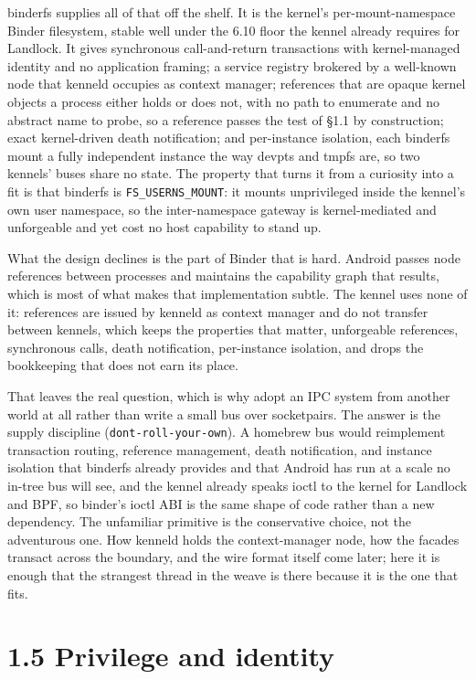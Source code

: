 binderfs supplies all of that off the shelf. It is the kernel's
per-mount-namespace Binder filesystem, stable well under the 6.10 floor
the kennel already requires for Landlock. It gives synchronous
call-and-return transactions with kernel-managed identity and no
application framing; a service registry brokered by a well-known node
that kenneld occupies as context manager; references that are opaque
kernel objects a process either holds or does not, with no path to
enumerate and no abstract name to probe, so a reference passes the test
of §1.1 by construction; exact kernel-driven death notification; and
per-instance isolation, each binderfs mount a fully independent instance
the way devpts and tmpfs are, so two kennels' buses share no state. The
property that turns it from a curiosity into a fit is that binderfs is
\texttt{FS\_USERNS\_MOUNT}: it mounts unprivileged inside the kennel's
own user namespace, so the inter-namespace gateway is kernel-mediated
and unforgeable and yet cost no host capability to stand up.

What the design declines is the part of Binder that is hard. Android
passes node references between processes and maintains the capability
graph that results, which is most of what makes that implementation
subtle. The kennel uses none of it: references are issued by kenneld as
context manager and do not transfer between kennels, which keeps the
properties that matter, unforgeable references, synchronous calls, death
notification, per-instance isolation, and drops the bookkeeping that
does not earn its place.

That leaves the real question, which is why adopt an IPC system from
another world at all rather than write a small bus over socketpairs. The
answer is the supply discipline (\texttt{dont-roll-your-own}). A
homebrew bus would reimplement transaction routing, reference
management, death notification, and instance isolation that binderfs
already provides and that Android has run at a scale no in-tree bus will
see, and the kennel already speaks ioctl to the kernel for Landlock and
BPF, so binder's ioctl ABI is the same shape of code rather than a new
dependency. The unfamiliar primitive is the conservative choice, not the
adventurous one. How kenneld holds the context-manager node, how the
facades transact across the boundary, and the wire format itself come
later; here it is enough that the strangest thread in the weave is there
because it is the one that fits.

\hypertarget{privilege-and-identity}{%
\section{1.5 Privilege and identity}\label{privilege-and-identity}}


